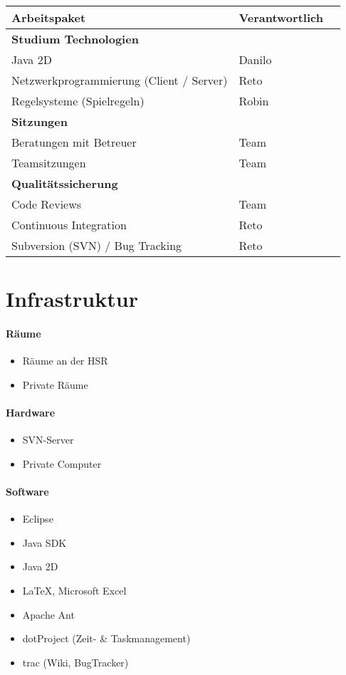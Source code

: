 \documentclass[a4paper,12pt,halfparskip,DIV14]{scrreprt}
\begin{document}
\begin{tabular}{@{} l l l @{}}
\toprule
Arbeitspaket & Verantwortlich \\
\midrule
\textbf{Studium Technologien} &  & \\
Java 2D & Danilo & \\
Netzwerkprogrammierung (Client / Server) & Reto & \\
Regelsysteme (Spielregeln) & Robin & \\
\midrule
\textbf{Sitzungen} &  & \\
Beratungen mit Betreuer & Team & \\
Teamsitzungen & Team & \\
\midrule
\textbf{Qualitätssicherung} &  & \\
Code Reviews & Team & \\
Continuous Integration & Reto & \\
Subversion (SVN) / Bug Tracking & Reto & \\
\bottomrule
\end{tabular}


\section{Infrastruktur}

\paragraph{Räume}
\begin{itemize}
	\item Räume an der HSR
	\item Private Räume
\end{itemize}

\paragraph{Hardware}
\begin{itemize}
	\item SVN-Server
	\item Private Computer
\end{itemize}

\paragraph{Software}
\begin{itemize}
	\item Eclipse
	\item Java SDK
	\item Java 2D
	\item \LaTeX{}, Microsoft Excel
	\item Apache Ant
	\item dotProject (Zeit- \& Taskmanagement)
	\item trac (Wiki, BugTracker)
\end{itemize}
\end{document}
